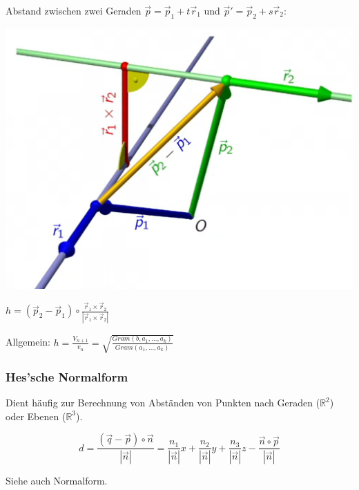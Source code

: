\noindent Abstand zwischen zwei Geraden $\vec{p} = \vec{p}_1 + t\vec{r}_1$ und $\vec{p}' = \vec{p}_2 + s\vec{r}_2$:
\begin{center}
	\begin{minipage}{0.25\textwidth}
		\includegraphics[width=\linewidth,keepaspectratio=true]{./Images/AbstandGerade.png}
	\end{minipage}%
	\begin{minipage}{0.2\textwidth}
		$h = (\vec{p}_2 - \vec{p}_1) \circ \frac{\vec{r}_1 \times \vec{r}_2}{|\vec{r}_1 \times \vec{r}_2|}$
	\end{minipage}
\end{center}


\noindent Allgemein:
$h = \frac{V_{n+1}}{v_n} = \sqrt{\frac{Gram(b, a_1, \dots, a_k)}{Gram(a_1, \dots, a_k)}}$

\subsubsection{Hes'sche Normalform}
Dient häufig zur Berechnung von Abständen von Punkten nach Geraden ($\mathbb{R}^2$) oder Ebenen ($\mathbb{R}^3$).

\[
d = \frac{(\vec{q} - \vec{p}) \circ \vec{n}}{|\vec{n}|} = \frac{n_1}{|\vec{n}|}x + \frac{n_2}{|\vec{n}|}y + \frac{n_3}{|\vec{n}|}z - \frac{\vec{n} \circ \vec{p}}{|\vec{n}|}
\] 

\noindent Siehe auch  Normalform.\\

